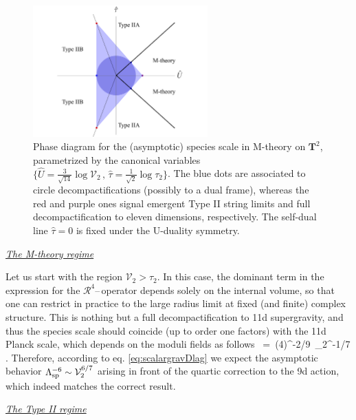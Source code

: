 \begin{figure}[htb]
\begin{center}
\includegraphics[width=0.6\textwidth]{CH-1-1v2.pdf}
\caption{\small Phase diagram for the (asymptotic) species scale in M-theory on $\mathbf{T}^2$, parametrized by the canonical variables $\{ \hat U = \frac{3}{\sqrt{14}} \log \mathcal{V}_2\, ,\, \hat \tau= \frac{1}{\sqrt{2}}\log \tau_2\}$. The blue dots are associated to circle decompactifications (possibly to a dual frame), whereas the red and purple ones signal emergent Type II string limits and full decompactification to eleven dimensions, respectively. The self-dual line $\hat{\tau}=0$ is fixed under the U-duality symmetry.}
\label{fig:MthyT2}
\end{center}
\end{figure}

\underline{\textit{The M-theory regime}}
\newline

Let us start with the region $\mathcal{V}_2 > \tau_2$. In this case, the dominant term in the expression for the $\mathcal{R}^4$--\,operator depends solely on the internal volume, so that one can restrict in practice to the large radius limit at fixed (and finite) complex structure. This is nothing but a full decompactification to 11d supergravity, and thus the species scale should coincide (up to order one factors) with the 11d Planck scale, which depends on the moduli fields as follows
%
\beq
{}\, =\, (4\pi)^{-2/9}\, _2^{-1/7}\, .
\label{eq:11dPlanckmass}
\eeq
%
Therefore, according to eq. \eqref{eq:scalargravDlag} we expect the asymptotic behavior $\Lambda_{\text{sp}}^{-6} \sim \mathcal{V}_2^{6/7}$ arising in front of the quartic correction to the 9d action, which indeed matches the correct result. 
\newpage

\underline{\textit{The Type II regime}}
\newline

